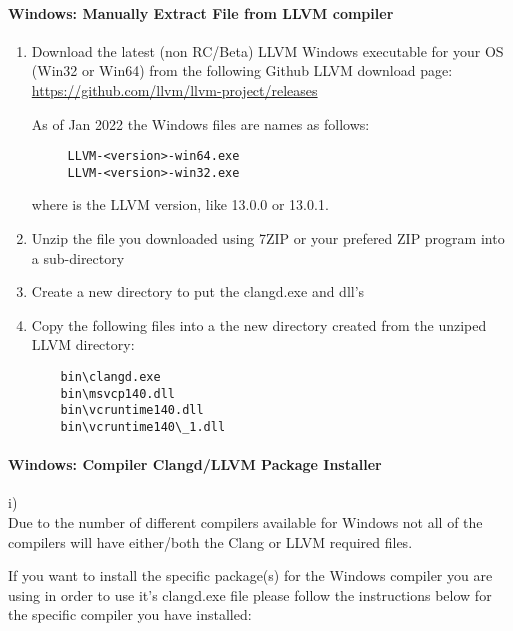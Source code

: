 \paragraph*{Windows: Manually Extract File from LLVM compiler}\label{sec:llvm_extract}
\begin{enumerate}[noitemsep]
\item Download the latest (non RC/Beta) LLVM Windows executable for your OS (Win32 or Win64) from the following Github LLVM download page:\newline
      \url{https://github.com/llvm/llvm-project/releases} \newline

  As of Jan 2022 the Windows files are names as follows:
  \begin{verbatim}
     LLVM-<version>-win64.exe
     LLVM-<version>-win32.exe
  \end{verbatim}
  where  is the LLVM version, like 13.0.0 or 13.0.1.\\

\item Unzip the  file you downloaded using 7ZIP or your prefered ZIP program into a sub-directory
\item Create a new directory to put the clangd.exe and dll's
\item Copy the following files into a the new directory created from the unziped LLVM directory:
    \begin{verbatim}
    bin\clangd.exe
    bin\msvcp140.dll
    bin\vcruntime140.dll
    bin\vcruntime140\_1.dll
    \end{verbatim}
\end{enumerate}

\paragraph*{Windows: Compiler Clangd/LLVM Package Installer}\label{sec:win_packages}         i) \\
   Due to the number of different compilers available for Windows not all of the compilers will have either/both 
   the Clang or LLVM required files.

   If you want to install the specific package(s) for the Windows compiler you are using in order to use it's clangd.exe file please follow the instructions below for the specific compiler you have installed:

